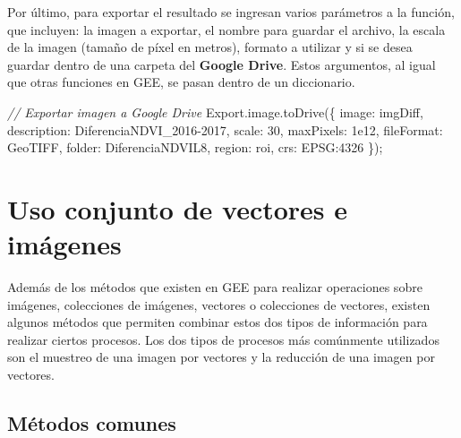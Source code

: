 \documentclass[
  12pt,
  letterpaper,
  twoside]{book}
\newenvironment{Shaded}{\begin{snugshade}}{\end{snugshade}}
\newcommand{\AttributeTok}[1]{\textcolor[rgb]{0.48,0.12,0.64}{#1}}
\newcommand{\CommentTok}[1]{\textcolor[rgb]{0.24,0.58,0.00}{\textit{#1}}}
\newcommand{\DataTypeTok}[1]{\textcolor[rgb]{0.00,0.00,0.00}{#1}}
\newcommand{\DecValTok}[1]{\textcolor[rgb]{0.28,0.53,0.93}{#1}}
\newcommand{\FloatTok}[1]{\textcolor[rgb]{0.28,0.53,0.93}{#1}}
\newcommand{\FunctionTok}[1]{\textcolor[rgb]{0.48,0.12,0.64}{#1}}
\newcommand{\NormalTok}[1]{#1}
\newcommand{\OperatorTok}[1]{\textcolor[rgb]{0.00,0.00,0.00}{#1}}
\newcommand{\StringTok}[1]{\textcolor[rgb]{0.87,0.29,0.22}{#1}}
\begin{document}
Por último, para exportar el resultado se ingresan varios parámetros a la función, que incluyen: la imagen a exportar, el nombre para guardar el archivo, la escala de la imagen (tamaño de píxel en metros), formato a utilizar y si se desea guardar dentro de una carpeta del \textbf{Google Drive}. Estos argumentos, al igual que otras funciones en GEE, se pasan dentro de un diccionario.

\begin{Shaded}
\begin{Highlighting}[]
\CommentTok{// Exportar imagen a Google Drive}
\NormalTok{Export}\OperatorTok{.}\AttributeTok{image}\OperatorTok{.}\FunctionTok{toDrive}\NormalTok{(\{}
  \DataTypeTok{image}\OperatorTok{:}\NormalTok{ imgDiff}\OperatorTok{,}
  \DataTypeTok{description}\OperatorTok{:} \StringTok{\textquotesingle{}DiferenciaNDVI\_2016{-}2017\textquotesingle{}}\OperatorTok{,}
  \DataTypeTok{scale}\OperatorTok{:} \DecValTok{30}\OperatorTok{,}
  \DataTypeTok{maxPixels}\OperatorTok{:} \FloatTok{1e12}\OperatorTok{,}
  \DataTypeTok{fileFormat}\OperatorTok{:} \StringTok{\textquotesingle{}GeoTIFF\textquotesingle{}}\OperatorTok{,}
  \DataTypeTok{folder}\OperatorTok{:} \StringTok{\textquotesingle{}DiferenciaNDVIL8\textquotesingle{}}\OperatorTok{,}
  \DataTypeTok{region}\OperatorTok{:}\NormalTok{ roi}\OperatorTok{,}
  \DataTypeTok{crs}\OperatorTok{:} \StringTok{\textquotesingle{}EPSG:4326}
\NormalTok{\})}\OperatorTok{;} 
\end{Highlighting}
\end{Shaded}

\newpage

\hypertarget{uso-conjunto-de-vectores-e-imuxe1genes}{%
\chapter{Uso conjunto de vectores e imágenes}\label{uso-conjunto-de-vectores-e-imuxe1genes}}

Además de los métodos que existen en GEE para realizar operaciones sobre
imágenes, colecciones de imágenes, vectores o colecciones de vectores,
existen algunos métodos que permiten combinar estos dos tipos de
información para realizar ciertos procesos. Los dos tipos de procesos
más comúnmente utilizados son el muestreo de una imagen por vectores y
la reducción de una imagen por vectores.

\hypertarget{muxe9todos-comunes-5}{%
\section{Métodos comunes}\label{muxe9todos-comunes-5}}
\end{document}
